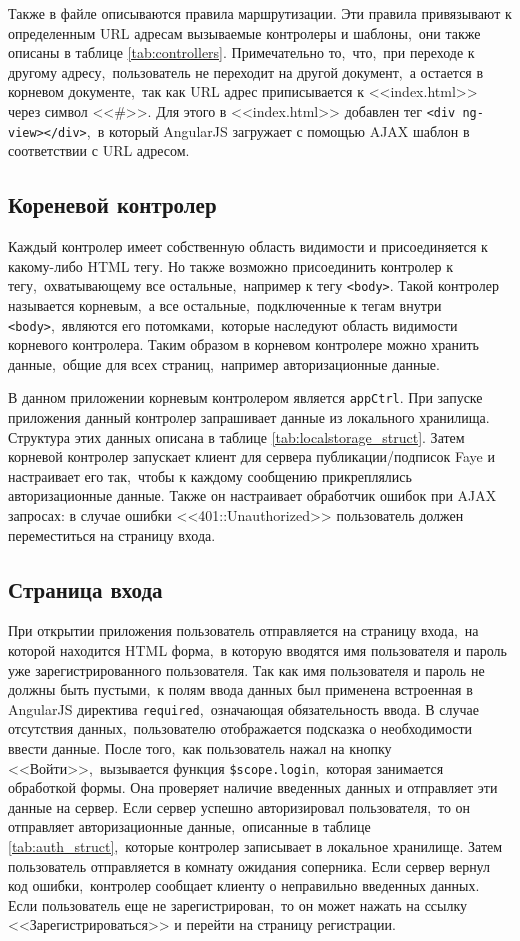 \documentclass[14pt,a4paper]{report}
\begin{document}
Также в файле описываются правила маршрутизации. Эти правила привязывают к определенным URL адресам вызываемые контролеры и шаблоны,~они также описаны в таблице \ref{tab:controllers}. Примечательно то,~что,~при переходе к другому адресу,~пользователь не переходит на другой документ,~а остается в корневом документе,~так как URL адрес приписывается к <<index.html>> через символ <<\#>>. Для этого в <<index.html>> добавлен тег \lstinline$<div ng-view></div>$,~в который AngularJS загружает с помощью AJAX шаблон в соответствии с URL адресом.

\subsection{Кореневой контролер}
Каждый контролер имеет собственную область видимости и присоединяется к какому-либо HTML тегу. Но также возможно присоединить контролер к тегу,~охватывающему все остальные,~например к тегу \lstinline$<body>$. Такой контролер называется корневым,~а все остальные,~подключенные к тегам внутри \lstinline$<body>$,~являются его потомками,~которые наследуют область видимости корневого контролера. Таким образом в корневом контролере можно хранить данные,~общие для всех страниц,~например авторизационные данные.

В данном приложении корневым контролером является \lstinline$appCtrl$. При запуске приложения данный контролер запрашивает данные из локального хранилища. Структура этих данных описана в таблице \ref{tab:localstorage_struct}. Затем корневой контролер запускает клиент для сервера публикации/подписок Faye и настраивает его так,~чтобы к каждому сообщению прикреплялись авторизационные данные. Также он настраивает обработчик ошибок при AJAX запросах: в случае ошибки <<401::Unauthorized>> пользователь должен переместиться на страницу входа.

\subsection{Страница входа}
При открытии приложения пользователь отправляется на страницу входа,~на которой находится HTML форма,~в которую вводятся имя пользователя и пароль уже зарегистрированного пользователя. Так как имя пользователя и пароль не должны быть пустыми,~к полям ввода данных был применена встроенная в AngularJS директива \lstinline$required$,~означающая обязательность ввода. В случае отсутствия данных,~пользователю отображается подсказка о необходимости ввести данные. После того,~как пользователь нажал на кнопку <<Войти>>,~вызывается функция \lstinline{$scope.login},~которая занимается обработкой формы. Она проверяет наличие введенных данных и отправляет эти данные на сервер. Если сервер успешно авторизировал пользователя,~то он отправляет авторизационные данные,~описанные в таблице \ref{tab:auth_struct},~которые контролер записывает в локальное хранилище. Затем пользователь отправляется в комнату ожидания соперника. Если сервер вернул код ошибки,~контролер сообщает клиенту о неправильно введенных данных. Если пользователь еще не зарегистрирован,~то он может нажать на ссылку <<Зарегистрироваться>> и перейти на страницу регистрации.
\end{document}
